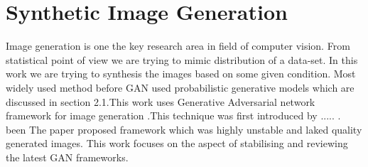 \section{Synthetic Image Generation}
Image generation is one the key research area in field of computer vision. From statistical point of view we are trying to mimic distribution of a data-set. In this work we are trying to synthesis the images based on some given condition. Most widely used method before GAN used probabilistic generative models which are discussed in section 2.1.This work uses Generative Adversarial network framework for image generation .This technique was first introduced by ..... . been The paper proposed framework which was highly unstable and laked quality generated images.  This work focuses on the aspect of stabilising and reviewing the latest GAN frameworks.

